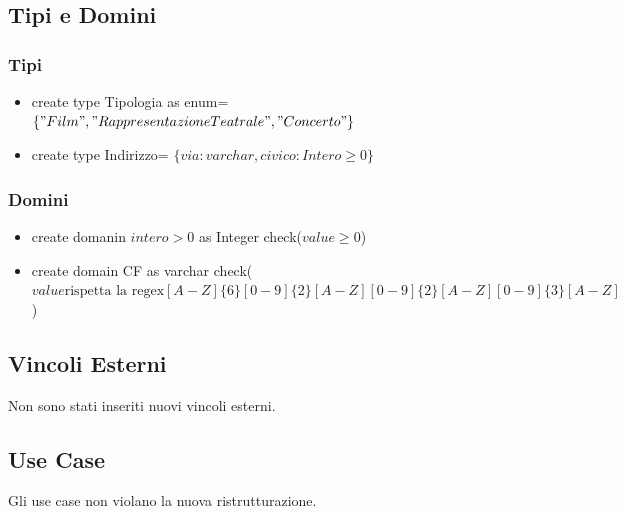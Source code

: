 \documentclass[12pt, letterpaper]{article}
\begin{document}
\subsection{Tipi e Domini}
\subsubsection{Tipi}
\begin{itemize}
    \item create type Tipologia as enum= $\{"Film", "Rappresentazione Teatrale", "Concerto"\}$
    \item create type Indirizzo= $\{via: varchar, civico: Intero \ge 0\}$
\end{itemize}
\subsubsection{Domini}
\begin{itemize}
    \item create domanin $intero>0$ as Integer check($value \ge 0$)
    \item create domain CF as varchar check($value \text{rispetta la regex} [A-Z]\{6\}[0-9]\{2\}[A-Z][0-9]\{2\}[A-Z][0-9]\{3\}[A-Z]$)
\end{itemize}
\subsection{Vincoli Esterni}
Non sono stati inseriti nuovi vincoli esterni.
\subsection{Use Case}
Gli use case non violano la nuova ristrutturazione.
\newpage
\end{document}
